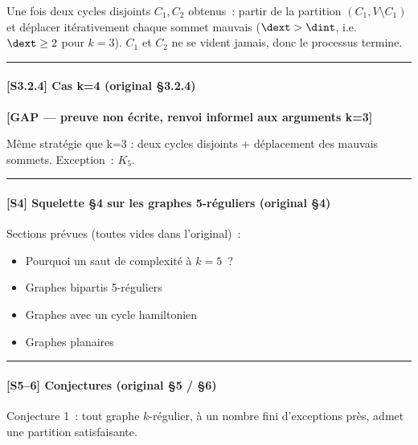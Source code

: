 Une fois deux cycles disjoints $C_1, C_2$ obtenus~: partir de la partition $(C_1, V \setminus C_1)$
et déplacer itérativement chaque sommet mauvais ($\dext > \dint$, i.e.\ $\dext \geq 2$ pour $k=3$).
$C_1$ et $C_2$ ne se vident jamais, donc le processus termine.

\bigskip\hrule\bigskip

\paragraph{[S3.2.4] Cas k=4 (original §3.2.4)}
\textbf{[GAP — preuve non écrite, renvoi informel aux arguments k=3]}

Même stratégie que k=3 : deux cycles disjoints + déplacement des mauvais sommets.
Exception~: $K_5$.

\bigskip\hrule\bigskip

\paragraph{[S4] Squelette §4 sur les graphes 5-réguliers (original §4)}

Sections prévues (toutes vides dans l'original)~:
\begin{itemize}
    \item Pourquoi un saut de complexité à $k = 5$~?
    \item Graphes bipartis 5-réguliers
    \item Graphes avec un cycle hamiltonien
    \item Graphes planaires
\end{itemize}

\bigskip\hrule\bigskip

\paragraph{[S5--6] Conjectures (original §5 / §6)}

Conjecture 1~: tout graphe $k$-régulier, à un nombre fini d'exceptions près,
admet une partition satisfaisante.

